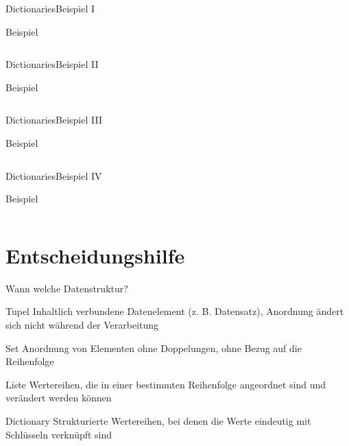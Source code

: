 \documentclass[xelatex,aspectratio=169]{beamer}
\begin{document}
\begin{frame}{Dictionaries}{Beispiel I}
    \begin{exampleblock}{Beispiel}
        \inputminted[firstline=1,lastline=11]{python}{src/dictionaries_example.py}
    \end{exampleblock}
\end{frame}
\begin{frame}{Dictionaries}{Beispiel II}
    \begin{exampleblock}{Beispiel}
        \inputminted[firstline=13,lastline=18]{python}{src/dictionaries_example.py}
    \end{exampleblock}
\end{frame}
\begin{frame}{Dictionaries}{Beispiel III}
    \vspace{-.2cm}
    \begin{exampleblock}{Beispiel}
        \inputminted[firstline=21,lastline=33]{python}{src/dictionaries_example.py}
    \end{exampleblock}
\end{frame}
\begin{frame}{Dictionaries}{Beispiel IV}
    \begin{exampleblock}{Beispiel}
        \inputminted[firstline=36,lastline=39]{python}{src/dictionaries_example.py}
    \end{exampleblock}
\end{frame}

\section{Entscheidungshilfe}

\begin{frame}{Wann welche Datenstruktur?}

    \begin{block}{Tupel}
        Inhaltlich verbundene Datenelement (z. B. Datensatz), Anordnung ändert sich nicht während der Verarbeitung
    \end{block}

    \begin{block}{Set}
        Anordnung von Elementen ohne Doppelungen, ohne Bezug auf die Reihenfolge
    \end{block}

    \begin{block}{Liste}
        Wertereihen, die in einer bestimmten Reihenfolge angeordnet sind und verändert werden können
    \end{block}

    \begin{block}{Dictionary}
        Strukturierte Wertereihen, bei denen die Werte eindeutig mit Schlüsseln verknüpft sind
    \end{block}

\end{frame}
\end{document}
